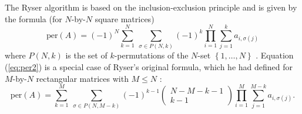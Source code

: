 \documentclass{article}
\begin{document}
The Ryser algorithm is based on the inclusion-exclusion principle and is given by the formula
(for $N$-by-$N$ square matrices)
\begin{equation} \label{eq:per2}
    \text{per}(A) = \left(-1\right)^N \sum_{k=1}^N{
        ~\sum_{\sigma \in P(N,k)}{
            {\left(-1\right)}^{k}
            \prod_{i=1}^N{
                \sum_{j=1}^{k}{a_{i,{\sigma(j)}}}
            }
        }
    }
\end{equation}
where $P(N,k)$ is the set of $k$-permutations of the $N$-set $\left\{1,\dots,N\right\}$
\cite{wiki:permanent}.  Equation (\ref{eq:per2}) is a special case of Ryser's original formula,
which he had defined for $M$-by-$N$ rectangular matrices with $M \leq N$ \cite{ryser1963}: 
\begin{equation} \label{eq:rectper2}
    \text{per}(A) = \sum_{k=1}^{M}{
        ~\sum_{\sigma \in P(N,M-k)}{
            {\left(-1\right)}^{k-1} \left(\begin{matrix}N - M - k - 1\\ k - 1\end{matrix}\right)
            \prod_{i=1}^M{
                \sum_{j=1}^{M-k}{a_{i,{\sigma(j)}}}
            }
        }
    }.
\end{equation}
\end{document}
